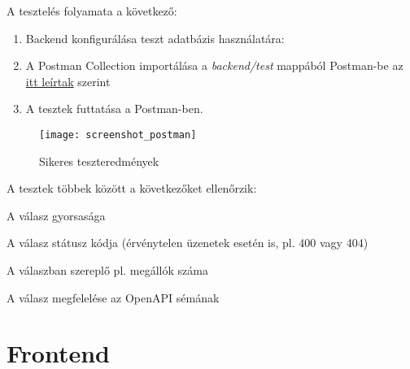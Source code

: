 A tesztelés folyamata a következő:

\begin{enumerate}
    \item Backend konfigurálása teszt adatbázis használatára:
    \item A Postman Collection importálása a \textit{backend/test} mappából Postman-be az \href{https://learning.postman.com/docs/getting-started/importing-and-exporting/importing-data/#import-postman-data}{itt leírtak} szerint
    \item A tesztek futtatása a Postman-ben.
\end{enumerate}

\begin{figure}[H]
    \centering
    \texttt{[image: screenshot\_postman]}
    \caption{Sikeres teszteredmények}
    \label{fig:screenshot-postman}
\end{figure}

A tesztek többek között a következőket ellenőrzik:
\begin{compactenum}
    \item A válasz gyorsasága
    \item A válasz státusz kódja (érvénytelen üzenetek esetén is, pl. 400 vagy 404)
    \item A válaszban szereplő pl. megállók száma
    \item A válasz megfelelése az OpenAPI sémának
\end{compactenum}

\section{Frontend}

